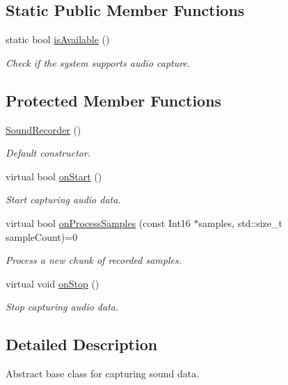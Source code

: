 \subsection*{Static Public Member Functions}
\begin{DoxyCompactItemize}
\item 
static bool \hyperlink{classsf_1_1_sound_recorder_aab2bd0fee9e48d6cfd449b1cb078ce5a}{is\+Available} ()
\begin{DoxyCompactList}\small\item\em Check if the system supports audio capture. \end{DoxyCompactList}\end{DoxyCompactItemize}
\subsection*{Protected Member Functions}
\begin{DoxyCompactItemize}
\item 
\hyperlink{classsf_1_1_sound_recorder_a50ebad413c4f157408a0fa49f23212a9}{Sound\+Recorder} ()
\begin{DoxyCompactList}\small\item\em Default constructor. \end{DoxyCompactList}\item 
virtual bool \hyperlink{classsf_1_1_sound_recorder_a7af418fb036201d3f85745bef78ce77f}{on\+Start} ()
\begin{DoxyCompactList}\small\item\em Start capturing audio data. \end{DoxyCompactList}\item 
virtual bool \hyperlink{classsf_1_1_sound_recorder_a2670124cbe7a87c7e46b4840807f4fd7}{on\+Process\+Samples} (const Int16 $\ast$samples, std\+::size\+\_\+t sample\+Count)=0
\begin{DoxyCompactList}\small\item\em Process a new chunk of recorded samples. \end{DoxyCompactList}\item 
virtual void \hyperlink{classsf_1_1_sound_recorder_aefc36138ca1e96c658301280e4a31b64}{on\+Stop} ()
\begin{DoxyCompactList}\small\item\em Stop capturing audio data. \end{DoxyCompactList}\end{DoxyCompactItemize}


\subsection{Detailed Description}
Abstract base class for capturing sound data. 

